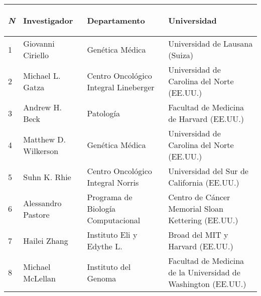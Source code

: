 \begin{table*}[!htb]
		\footnotesize
		\centering
		\begin{threeparttable}
			\begin{tabular}{p{0.5cm} p{3.5cm} p{4cm} p{5.5cm}} \toprule
				\begin{center}\textit{N}\end{center}   
				&\begin{center}Investigador\end{center}       
				&\begin{center}Departamento\end{center}
				&\begin{center}Universidad\end{center}  
				\\ \hline
				1
				& Giovanni Ciriello
				& Genética Médica
				& Universidad de Lausana (Suiza)
				\\ \hline
				2
				& Michael L. Gatza
				& Centro Oncológico Integral Lineberger
				& Universidad de Carolina del Norte (EE.UU.)
				\\ \hline
				3
				& Andrew H. Beck
				& Patología
				& Facultad de Medicina de Harvard (EE.UU.)
				\\ \hline
				4
				& Matthew D. Wilkerson
				& Genética Médica
				& Universidad de Carolina del Norte (EE.UU.)
				\\ \hline
				5
				& Suhn K. Rhie
				& Centro Oncológico Integral Norris
				& Universidad del Sur de California (EE.UU.)
				\\ \hline
				6
				& Alessandro Pastore
				& Programa de Biología Computacional
				& Centro de Cáncer Memorial Sloan Kettering (EE.UU.)
				\\ \hline
				7
				& Hailei Zhang
				& Instituto Eli y Edythe L.
				& Broad del MIT y Harvard (EE.UU.)
				\\ \hline
				8
				& Michael McLellan
				& Instituto del Genoma
				& Facultad de Medicina de la Universidad de Washington (EE.UU.)					

\end{tabular}
\end{threeparttable}
\end{table*}
